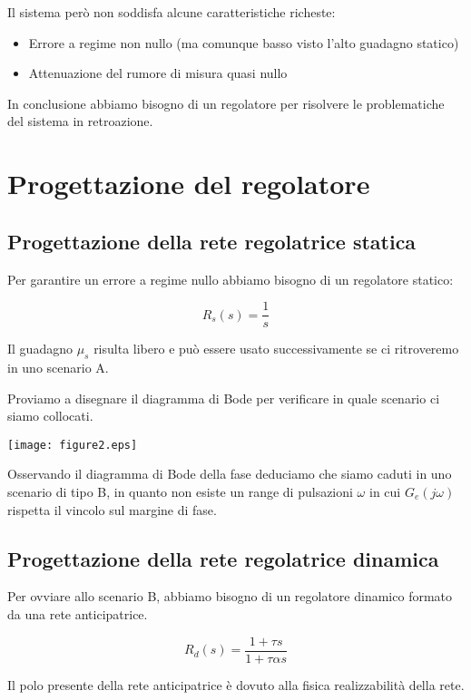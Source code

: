 \documentclass{article}
\begin{document}
Il sistema però non soddisfa alcune caratteristiche richeste:

\begin{itemize}
    \item Errore a regime non nullo (ma comunque basso visto l'alto guadagno statico)
    \item Attenuazione del rumore di misura quasi nullo
\end{itemize}

In conclusione abbiamo bisogno di un regolatore per risolvere le problematiche del sistema in retroazione.

\section{Progettazione del regolatore}

\subsection{Progettazione della rete regolatrice statica}

Per garantire un errore a regime nullo abbiamo bisogno di un regolatore statico:

$$
R_s(s)=\frac{1}{s}
$$

Il guadagno $\mu_s$ risulta libero e può essere usato successivamente se ci ritroveremo in uno scenario A.

Proviamo a disegnare il diagramma di Bode per verificare in quale scenario ci siamo collocati.

\begin{center}
    \texttt{[image: figure2.eps]}
\end{center}

Osservando il diagramma di Bode della fase deduciamo che siamo caduti in uno scenario di tipo B, in quanto non esiste un range di pulsazioni $\omega$ in cui $G_e(j\omega)$ rispetta il vincolo sul margine di fase.

\subsection{Progettazione della rete regolatrice dinamica}

Per ovviare allo scenario B, abbiamo bisogno di un regolatore dinamico formato da una rete anticipatrice.

$$
R_d(s)=\frac{1+\tau s}{1+\tau \alpha s}
$$

Il polo presente della rete anticipatrice è dovuto alla fisica realizzabilità della rete.
\end{document}
